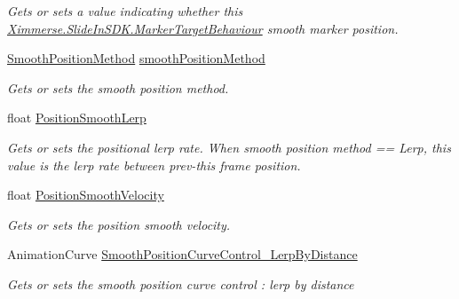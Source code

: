 \begin{DoxyCompactItemize}
\begin{DoxyCompactList}\small\item\em Gets or sets a value indicating whether this \mbox{\hyperlink{class_ximmerse_1_1_slide_in_s_d_k_1_1_marker_target_behaviour}{Ximmerse.\+Slide\+In\+S\+D\+K.\+Marker\+Target\+Behaviour}} smooth marker position. \end{DoxyCompactList}\item 
\mbox{\hyperlink{class_ximmerse_1_1_slide_in_s_d_k_1_1_marker_target_behaviour_a7dcc532413ef0b35cf9f17dc0ae276bb}{Smooth\+Position\+Method}} \mbox{\hyperlink{class_ximmerse_1_1_slide_in_s_d_k_1_1_marker_target_behaviour_a1df1bc0ddda49ca592b0b765a5bf3277}{smooth\+Position\+Method}}
\begin{DoxyCompactList}\small\item\em Gets or sets the smooth position method. \end{DoxyCompactList}\item 
float \mbox{\hyperlink{class_ximmerse_1_1_slide_in_s_d_k_1_1_marker_target_behaviour_a0ea6738a55d9d73abac0a787be58cbf5}{Position\+Smooth\+Lerp}}
\begin{DoxyCompactList}\small\item\em Gets or sets the positional lerp rate. When smooth position method == Lerp, this value is the lerp rate between prev-\/this frame position. \end{DoxyCompactList}\item 
float \mbox{\hyperlink{class_ximmerse_1_1_slide_in_s_d_k_1_1_marker_target_behaviour_a0472ce602c4078d12a8ad4db8831148c}{Position\+Smooth\+Velocity}}
\begin{DoxyCompactList}\small\item\em Gets or sets the position smooth velocity. \end{DoxyCompactList}\item 
Animation\+Curve \mbox{\hyperlink{class_ximmerse_1_1_slide_in_s_d_k_1_1_marker_target_behaviour_a721ed9dfd9de88781cd8bd2f80e79819}{Smooth\+Position\+Curve\+Control\+\_\+\+Lerp\+By\+Distance}}
\begin{DoxyCompactList}\small\item\em Gets or sets the smooth position curve control \+: lerp by distance \end{DoxyCompactList}\item 

\end{DoxyCompactItemize}
